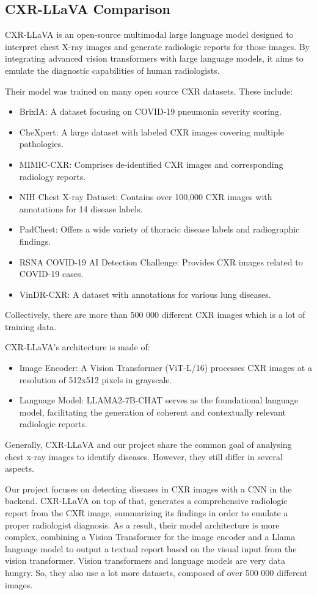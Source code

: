 \documentclass[12pt, titlepage]{article}
\begin{document}
\subsection{CXR-LLaVA Comparison}
CXR-LLaVA is an open-source multimodal large language model designed to interpret chest X-ray images and generate radiologic reports for those images. By integrating advanced vision transformers with large language models, it aims to emulate the diagnostic capabilities of human radiologists.

Their model was trained on many open source CXR datasets. These include:
\begin{itemize}
\item BrixIA: A dataset focusing on COVID-19 pneumonia severity scoring.
\item CheXpert: A large dataset with labeled CXR images covering multiple pathologies.
\item MIMIC-CXR: Comprises de-identified CXR images and corresponding radiology reports.
\item NIH Chest X-ray Dataset: Contains over 100,000 CXR images with annotations for 14 disease labels.
\item PadChest: Offers a wide variety of thoracic disease labels and radiographic findings.
\item RSNA COVID-19 AI Detection Challenge: Provides CXR images related to COVID-19 cases.
\item VinDR-CXR: A dataset with annotations for various lung diseases.
\end{itemize}

Collectively, there are more than 500 000 different CXR images which is a lot of training data.

CXR-LLaVA's architecture is made of:
\begin{itemize}
\item Image Encoder: A Vision Transformer (ViT-L/16) processes CXR images at a resolution of 512x512 pixels in grayscale.
\item Language Model: LLAMA2-7B-CHAT serves as the foundational language model, facilitating the generation of coherent and contextually relevant radiologic reports.
\end{itemize}

Generally, CXR-LLaVA and our project share the common goal of analysing chest x-ray images to identify diseases. However, they still differ in several aspects.

Our project focuses on detecting diseases in CXR images with a CNN in the backend. CXR-LLaVA on top of that, generates a comprehensive radiologic report from the CXR image, summarizing its findings in order to emulate a proper radiologist diagnosis. As a result, their model architecture is more complex, combining a Vision Transformer for the image encoder and a Llama language model to output a textual report based on the visual input from the vision transformer. Vision transformers and language models are very data hungry. So, they also use a lot more datasets, composed of over 500 000 different images.
\end{document}
